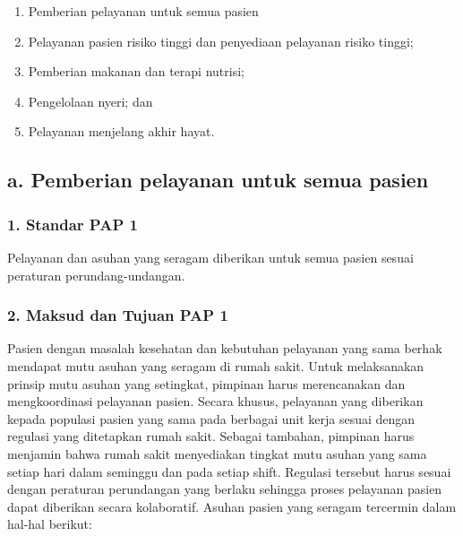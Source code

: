\documentclass[
]{book}
\providecommand{\tightlist}{%
  \setlength{\itemsep}{0pt}\setlength{\parskip}{0pt}}
\begin{document}
\begin{enumerate}
\def\labelenumi{\alph{enumi}.}
\tightlist
\item
  Pemberian pelayanan untuk semua pasien
\item
  Pelayanan pasien risiko tinggi dan penyediaan pelayanan risiko tinggi;
\item
  Pemberian makanan dan terapi nutrisi;
\item
  Pengelolaan nyeri; dan
\item
  Pelayanan menjelang akhir hayat.
\end{enumerate}

\hypertarget{a.-pemberian-pelayanan-untuk-semua-pasien}{%
\subsection*{a. Pemberian pelayanan untuk semua pasien}\label{a.-pemberian-pelayanan-untuk-semua-pasien}}

\hypertarget{standar-pap-1}{%
\subsubsection*{1. Standar PAP 1}\label{standar-pap-1}}

Pelayanan dan asuhan yang seragam diberikan untuk semua pasien sesuai peraturan perundang-undangan.

\hypertarget{maksud-dan-tujuan-pap-1}{%
\subsubsection*{2. Maksud dan Tujuan PAP 1}\label{maksud-dan-tujuan-pap-1}}

Pasien dengan masalah kesehatan dan kebutuhan pelayanan yang sama berhak mendapat mutu asuhan yang seragam di rumah sakit. Untuk melaksanakan prinsip mutu asuhan yang setingkat, pimpinan harus merencanakan dan mengkoordinasi pelayanan pasien. Secara khusus, pelayanan yang diberikan kepada populasi pasien yang sama pada berbagai unit kerja sesuai dengan regulasi yang ditetapkan rumah sakit. Sebagai tambahan, pimpinan harus menjamin bahwa rumah sakit menyediakan tingkat mutu asuhan yang sama setiap hari dalam seminggu dan pada setiap shift. Regulasi tersebut harus sesuai dengan peraturan perundangan yang berlaku sehingga proses pelayanan pasien dapat diberikan secara kolaboratif. Asuhan pasien yang seragam tercermin dalam hal-hal berikut:
\end{document}
